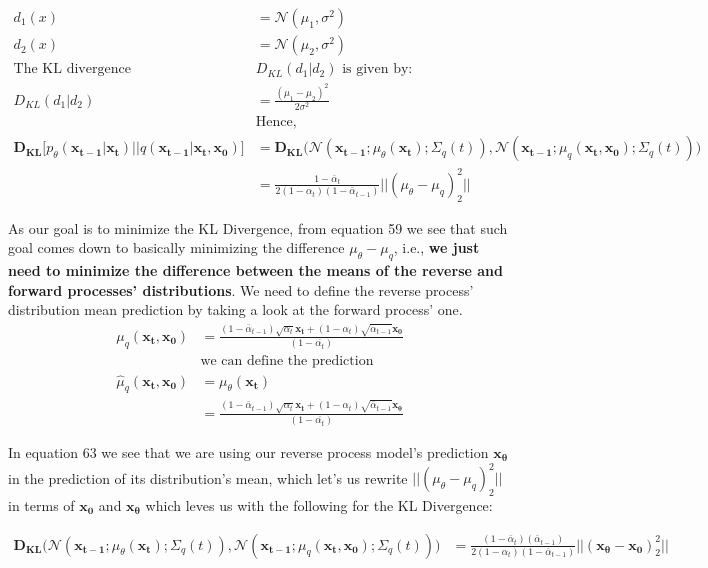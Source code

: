\documentclass{article}
\begin{document}
\begin{align}
	d_1(x) &= \mathcal{N}(\mu_1, \sigma^2)  \\
	d_2(x) &= \mathcal{N}(\mu_2, \sigma^2) \\
	\text{The KL divergence   } & D_{KL}(d_1 | d_2)  \text{   is given by:} \\
	D_{KL}(d_1 | d_2) &= \frac{(\mu_1 - \mu_2)^2}{2\sigma^2}\\
	&\text{Hence,  }\\
\mathbf{D_{KL}}\big[ p_\theta (\mathbf{x_{t-1} | x_t})  || q(\mathbf{x_{t-1} | x_t,  x_0}) \big] &=  \mathbf{D_{KL}}\big(   \mathcal{N}(\mathbf{x_{t-1}};  \mu_\theta(\mathbf{x_t}); \Sigma_q(t)), \mathcal{N}(\mathbf{x_{t-1}};  \mu_q(\mathbf{x_t, x_0}); \Sigma_q(t)) \big) \\
&=  \frac{1- \bar{\alpha}_t }{2(1-\alpha_t)(1- \bar\alpha_{t-1})} \big|\big| (\mu_\theta - \mu_q)^2_2\big|\big|
\end{align}

As our goal is to minimize the KL Divergence, from equation 59 we see that such goal comes down to basically minimizing the 
difference $\mu_\theta - \mu_q$, i.e., \textbf{we just need to minimize the difference between the means of the reverse and forward processes' distributions}. We need to define the reverse process' distribution mean prediction by taking a look at the forward process' one. 
\begin{align}
	 \mu_q(\mathbf{x_t, x_0}) &= \frac{(1-\bar{\alpha}_{t-1})\sqrt{\alpha_t} \mathbf{x_t} + (1- \alpha_t) \sqrt{\bar{\alpha}_{t-1}  } \mathbf{x_0}}{(1-\bar{\alpha_t})} \\
	 & \text{we can define the prediction }\\
	 \hat\mu_q(\mathbf{x_t, x_0}) &=  \mu_\theta(\mathbf{x_t}) \\
	 &= \frac{(1-\bar{\alpha}_{t-1})\sqrt{\alpha_t} \mathbf{x_t} + (1- \alpha_t) \sqrt{\bar{\alpha}_{t-1}  } \mathbf{x_\theta}}{(1-\bar{\alpha_t})}
\end{align}
	
In equation 63 we see that we are using our reverse process model's prediction $\mathbf{x_\theta}$ in the prediction of its distribution's mean, which let's us rewrite $\big|\big| (\mu_\theta - \mu_q)^2_2\big|\big|$ in terms of $\mathbf{x_0}$ and $\mathbf{x_\theta}$ which leves us with the following for the KL Divergence:
	
\begin{align}
	 \mathbf{D_{KL}}\big(   \mathcal{N}(\mathbf{x_{t-1}};  \mu_\theta(\mathbf{x_t}); \Sigma_q(t)), \mathcal{N}(\mathbf{x_{t-1}};  \mu_q(\mathbf{x_t, x_0}); \Sigma_q(t)) \big) &= \frac{(1- \bar{\alpha}_t)(\bar\alpha_{t-1}) }{2(1-\alpha_t)(1- \bar\alpha_{t-1})} \big|\big| (\mathbf{x_\theta - x_0})^2_2 \big|\big|
\end{align}
	
\end{document}

